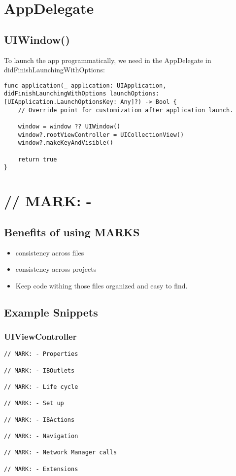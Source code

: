 \documentclass[]{article}
\newcommand{\<}{\guilsinglleft}
\renewcommand{\>}{\guilsinglright}
\begin{document}
\section{AppDelegate}
\subsection{UIWindow()}
To launch the app programmatically,  we need in the AppDelegate in didFinishLaunchingWithOptions:
\begin{lstlisting}
func application(_ application: UIApplication, didFinishLaunchingWithOptions launchOptions: [UIApplication.LaunchOptionsKey: Any]?) -> Bool {
	// Override point for customization after application launch.

	window = window ?? UIWindow()
	window?.rootViewController = UICollectionView()
	window?.makeKeyAndVisible()

	return true
}
\end{lstlisting}

\section{// MARK: -}
\subsection{Benefits of using MARKS}
\begin{itemize}
	\item consistency across files
	\item consistency across projects
	\item Keep code withing those files organized and easy to find.
\end{itemize}
\subsection{Example Snippets}
\subsubsection{UIViewController}
\begin{lstlisting}
// MARK: - Properties

// MARK: - IBOutlets

// MARK: - Life cycle

// MARK: - Set up

// MARK: - IBActions

// MARK: - Navigation

// MARK: - Network Manager calls

// MARK: - Extensions
\end{lstlisting} \cite{medium-ios-code-snipets}
\end{document}
